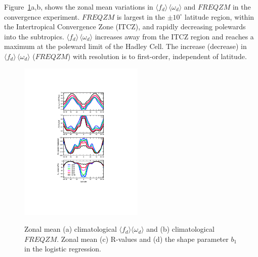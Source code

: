 \documentclass[times]{qjrms4}
\begin{document}
Figure~\ref{fig:4zonal}a,b, shows the zonal mean variations in $\langle f_{d} \rangle \, \langle \omega_{d} \rangle$ and $FREQZM$ in the convergence experiment. $FREQZM$ is largest in the $\pm 10^{\circ}$ latitude region, within the Intertropical Convergence Zone (ITCZ), and rapidly decreasing polewards into the subtropics. $\langle f_{d} \rangle \, \langle \omega_{d} \rangle$ increases away from the ITCZ region and reaches a maximum at the poleward limit of the Hadley Cell. The increase (decrease) in $\langle f_{d} \rangle \, \langle \omega_{d} \rangle$ ($FREQZM$) with resolution is to first-order, independent of latitude.

\begin{figure}
\begin{center}
\noindent\includegraphics[width=14pc,angle=0]{figs/temp_4zonal.pdf}\\
\end{center}
\caption{Zonal mean (a) climatological $\langle f_{d} \rangle \langle \omega_{d} \rangle$ and (b) climatological $FREQZM$. Zonal mean (c) R-values and (d) the shape parameter $b_1$ in the logistic regression.}
\label{fig:4zonal}
\end{figure}
\end{document}
